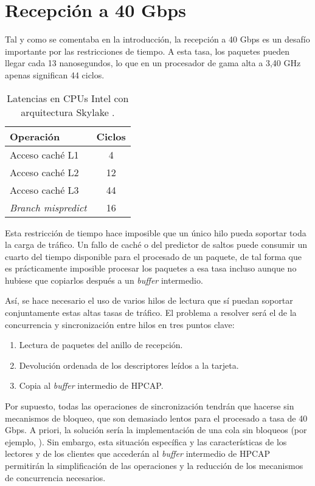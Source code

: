 \documentclass[oneside, draft]{epstfg}
\begin{document}
\section{Recepción a 40 Gbps}
\label{sec:Desarrollo:Recepcion40Gbps}

Tal y como se comentaba en la introducción, la recepción a 40 Gbps es un desafío importante por las restricciones de tiempo. A esta tasa, los paquetes pueden llegar cada 13 nanosegundos, lo que en un procesador de gama alta a 3,40 GHz apenas significan 44 ciclos.

\begin{wraptable}[8]{l}[1.5cm]{0.35\textwidth}
\vspace{-15pt}
\begin{tabular}{lc}
\toprule
\textbf{Operación} & \textbf{Ciclos} \\ \midrule
Acceso caché L1 & 4 \\
Acceso caché L2 & 12 \\
Acceso caché L3 & 44 \\
\textit{Branch mispredict} & 16 \\ \bottomrule
\end{tabular}
\caption{Latencias en CPUs Intel con arquitectura Skylake \cite{intelOptimization}.}
\label{tab:LatenciaIntelSkylake}
\end{wraptable}

Esta restricción de tiempo hace imposible que un único hilo pueda soportar toda la carga de tráfico. Un fallo de caché o del predictor de saltos puede consumir un cuarto del tiempo disponible para el procesado de un paquete, de tal forma que es prácticamente imposible procesar los paquetes a esa tasa incluso aunque no hubiese que copiarlos después a un \textit{buffer} intermedio.

Así, se hace necesario el uso de varios hilos de lectura que sí puedan soportar conjuntamente estas altas tasas de tráfico. El problema a resolver será el de la concurrencia y sincronización entre hilos en tres puntos clave:

\begin{enumerate}[itemsep=0pt, topsep = 0pt]
\item Lectura de paquetes del anillo de recepción.
\item Devolución ordenada de los descriptores leídos a la tarjeta.
\item Copia al \textit{buffer} intermedio de HPCAP.
\end{enumerate}

Por supuesto, todas las operaciones de sincronización tendrán que hacerse sin mecanismos de bloqueo, que son demasiado lentos para el procesado a tasa de 40 Gbps. A priori, la solución sería la implementación de una cola sin bloqueos (por ejemplo, \cite{krizhanovsky2013lock}). Sin embargo, esta situación específica y las características de los lectores y de los clientes que accederán al \textit{buffer} intermedio de HPCAP permitirán la simplificación de las operaciones y la reducción de los mecanismos de concurrencia necesarios.
\end{document}
